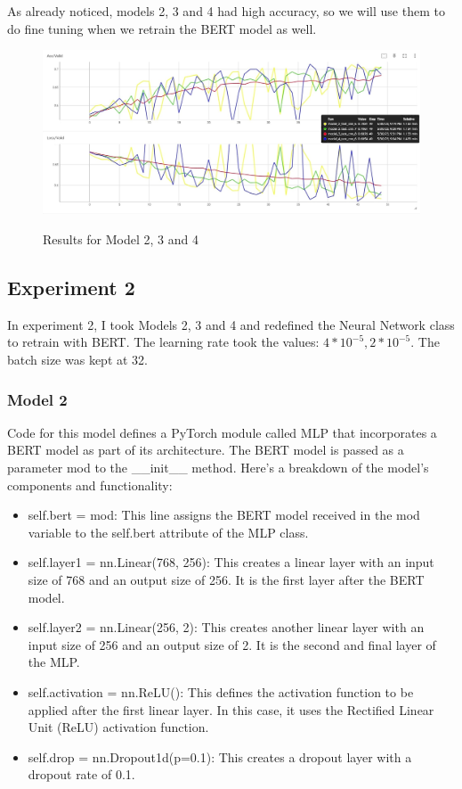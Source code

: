 As already noticed, models 2, 3 and 4 had high accuracy, so we will use them to do fine tuning when we retrain the BERT model as well.

\begin{center}
    \begin{figure}[!h]
        \centering
        \includegraphics[width=\textwidth]{images/exp1_hiperparametrizare.jpg}
        \label{fig:exp1_hiperm}
        \caption{Results for Model 2, 3 and 4}
    \end{figure}
\end{center}

\subsection{Experiment 2}

In experiment 2, I took Models 2, 3 and 4 and redefined the Neural Network class to retrain with BERT. The learning rate took the values: $4*10^{-5}, 2*10^{-5}$. The batch size was kept at 32.

\subsubsection{Model 2}

Code for this model defines a PyTorch module called MLP that incorporates a BERT model as part of its architecture. The BERT model is passed as a parameter mod to the \_\_init\_\_ method. Here's a breakdown of the model's components and functionality:

\begin{itemize}
    \item self.bert = mod: This line assigns the BERT model received in the mod variable to the self.bert attribute of the MLP class.
    \item self.layer1 = nn.Linear(768, 256): This creates a linear layer with an input size of 768 and an output size of 256. It is the first layer after the BERT model.
    \item self.layer2 = nn.Linear(256, 2): This creates another linear layer with an input size of 256 and an output size of 2. It is the second and final layer of the MLP.
    \item self.activation = nn.ReLU(): This defines the activation function to be applied after the first linear layer. In this case, it uses the Rectified Linear Unit (ReLU) activation function.
    \item self.drop = nn.Dropout1d(p=0.1): This creates a dropout layer with a dropout rate of 0.1. 
\end{itemize}

